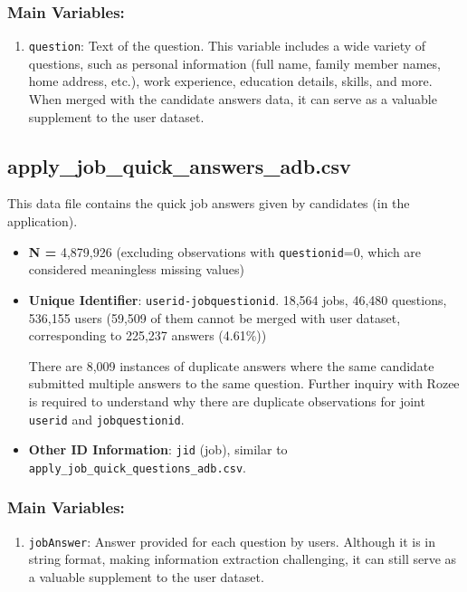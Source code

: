 \documentclass[12pt]{article}
\begin{document}
 \subsubsection*{Main Variables:}
    \begin{enumerate}
    
        \item \texttt{question}: Text of the question. This variable includes a wide variety of questions, such as personal information (full name, family member names, home address, etc.), work experience, education details, skills, and more. When merged with the candidate answers data, it can serve as a valuable supplement to the user dataset.
     \end{enumerate}



\subsection{apply\_job\_quick\_answers\_adb.csv}
This data file contains the quick job answers given by candidates (in the application).

\begin{itemize}
    \item \textbf{N =} 4,879,926 (excluding observations with \texttt{questionid}=0, which are considered meaningless missing values)
    \item \textbf{Unique Identifier}: \texttt{userid-jobquestionid}. 18,564 jobs, 46,480 questions, 536,155 users (59,509 of them cannot be merged with user dataset, corresponding to 225,237 answers (4.61\%))
    
    
    There are 8,009 instances of duplicate answers where the same candidate submitted multiple answers to the same question. Further inquiry with Rozee is required to understand why there are duplicate observations for joint \texttt{userid} and \texttt{jobquestionid}.

    
    \item \textbf{Other ID Information}: \texttt{jid} (job), similar to \texttt{apply\_job\_quick\_questions\_adb.csv}.
    \end{itemize}

    
 \subsubsection*{Main Variables:}
    \begin{enumerate}
        
        \item \texttt{jobAnswer}: Answer provided for each question by users. Although it is in string format, making information extraction challenging, it can still serve as a valuable supplement to the user dataset.
 \end{enumerate}
\end{document}
